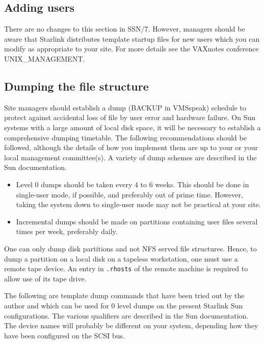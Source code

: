 \subsection{Adding users}

There are no changes to this section in SSN/7. However, managers should
be aware that Starlink distributes template startup files for new users
which you can modify as appropriate to your site. For more details see
the VAXnotes conference UNIX\_MANAGEMENT.

\subsection{Dumping the file structure}

Site managers should establish a dump (BACKUP in VMSspeak) schedule
to protect against accidental loss of file by user error and hardware failure.
On Sun systems with a large amount of local disk space, it will be necessary
to establish a comprehensive dumping timetable. The following recommendations
should be followed, although the details of how you implement them are
up to your or your local management committee(s). A variety of dump schemes are
described in the Sun documentation.

\begin{itemize}

\item Level 0 dumps should be taken every 4 to 6 weeks. This should be done
in single-user mode, if possible, and preferably out of prime time. However,
taking the system down to single-user mode may not be practical at your site.

\item Incremental dumps should be made on partitions containing user files
several times per week, preferably daily.

\end{itemize}

One can only dump disk partitions and not NFS served file structures. Hence,
to dump a partition on a local disk on a tapeless workstation, one must use
a remote tape device. An entry in {\tt .rhosts} of the remote machine is required
to allow use of its tape drive.

The following are template dump commands that have been tried out by the
author and which can be used for 0 level dumps on the present Starlink Sun
configurations. The various qualifiers are described  in the Sun documentation.
The device names will probably be different on your system, depending how they
have been configured on the SCSI bus.

